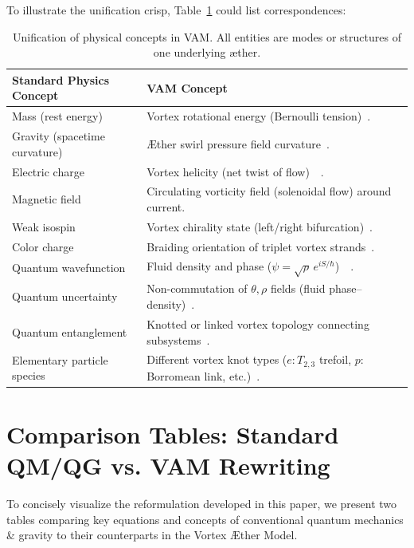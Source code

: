 \documentclass[a4paper,12pt]{article}
\begin{document}
    To illustrate the unification crisp, Table~\ref{tab:unification} could list correspondences:
    \begin{table}[H]
        \centering
        \scriptsize
        \begin{tabular}{p{} p{}}
            \hline
            Standard Physics Concept & VAM Concept \\
            \hline
            Mass (rest energy) & Vortex rotational energy (Bernoulli tension)~\cite{reference_168}. \\
            Gravity (spacetime curvature) & Æther swirl pressure field curvature~\cite{reference_169}. \\
            Electric charge & Vortex helicity (net twist of flow)~\cite{reference_170}~\cite{reference_171}. \\
            Magnetic field & Circulating vorticity field (solenoidal flow) around current. \\
            Weak isospin & Vortex chirality state (left/right bifurcation)~\cite{reference_172}. \\
            Color charge & Braiding orientation of triplet vortex strands~\cite{reference_173}. \\
            Quantum wavefunction & Fluid density and phase ($\psi = \sqrt{\rho}\,e^{iS/\hbar}$)~\cite{reference_174}~\cite{reference_175}. \\
            Quantum uncertainty & Non-commutation of $\theta,\rho$ fields (fluid phase–density)~\cite{reference_176}. \\
            Quantum entanglement & Knotted or linked vortex topology connecting subsystems~\cite{reference_177}. \\
            Elementary particle species & Different vortex knot types ($e: T_{2,3}$ trefoil, $p$: Borromean link, etc.)~\cite{reference_178}. \\
            \hline
        \end{tabular}
        \caption{Unification of physical concepts in VAM. All entities are modes or structures of one underlying æther.}
        \label{tab:unification}
    \end{table}

\section{Comparison Tables: Standard QM/QG vs. VAM Rewriting}
    To concisely visualize the reformulation developed in this paper, we present two tables comparing key equations and concepts of conventional quantum mechanics \& gravity to their counterparts in the Vortex Æther Model.
\end{document}
